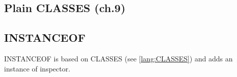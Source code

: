 \documentclass[../codeprint.tex]{subfiles}
\begin{document}
\subsection{Plain CLASSES (ch.9)}
\label{lang:CLASSES}



\subsection{INSTANCEOF}
INSTANCEOF is based on CLASSES (see \autoref{lang:CLASSES}) and adds an instance of inspector.


\end{document}
